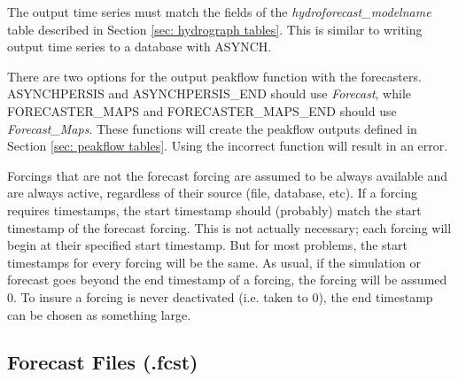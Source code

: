 \documentclass[12pt]{article}
\begin{document}
The output time series must match the fields of the \emph{hydroforecast\_modelname} table described in Section \ref{sec: hydrograph tables}. This is similar to writing output time series to a database with ASYNCH.

There are two options for the output peakflow function with the forecasters. ASYNCHPERSIS and ASYNCHPERSIS\_END should use \emph{Forecast}, while FORECASTER\_MAPS and FORECASTER\_MAPS\_END should use \emph{Forecast\_Maps}. These functions will create the peakflow outputs defined in Section \ref{sec: peakflow tables}. Using the incorrect function will result in an error.

Forcings that are not the forecast forcing are assumed to be always available and are always active, regardless of their source (file, database, etc). If a forcing requires timestamps, the start timestamp should (probably) match the start timestamp of the forecast forcing. This is not actually necessary; each forcing will begin at their specified start timestamp. But for most problems, the start timestamps for every forcing will be the same. As usual, if the simulation or forecast goes beyond the end timestamp of a forcing, the forcing will be assumed 0. To insure a forcing is never deactivated (i.e. taken to 0), the end timestamp can be chosen as something large.

\subsection{Forecast Files (.fcst)} \label{sec: forecast files}
\end{document}
